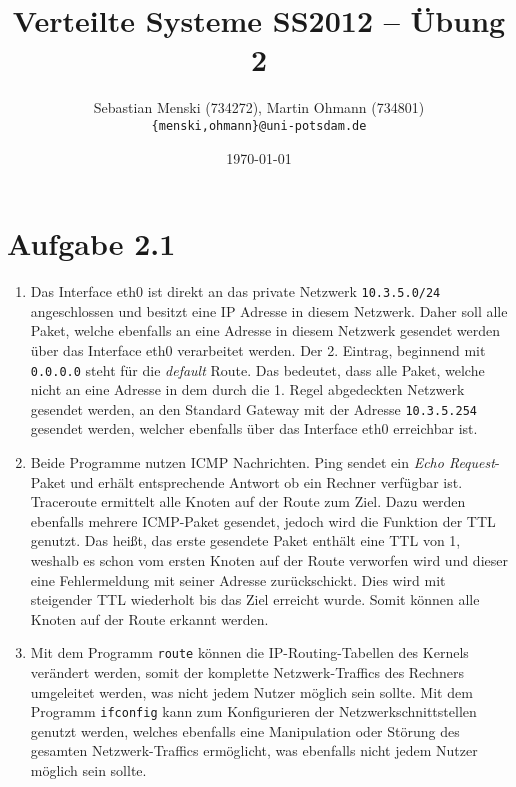 \documentclass[german,12pt,a4paper]{article}
\begin{document}
\title{\textbf{Verteilte Systeme SS2012 -- Übung 2}}
\author{Sebastian Menski (734272), Martin Ohmann (734801) \\ \texttt{\{menski,ohmann\}@uni-potsdam.de}}
\date{\today}

\maketitle

\section*{Aufgabe 2.1}

\begin{enumerate}

	\item Das Interface eth0 ist direkt an das private Netzwerk \texttt{10.3.5.0/24} angeschlossen und
	besitzt eine IP Adresse in diesem Netzwerk. Daher soll alle Paket, welche ebenfalls an eine
	Adresse in diesem Netzwerk gesendet werden über das Interface eth0 verarbeitet werden. Der 2.
	Eintrag, beginnend mit \texttt{0.0.0.0} steht für die \textit{default} Route. Das bedeutet, dass
	alle Paket, welche nicht an eine Adresse in dem durch die 1. Regel abgedeckten Netzwerk gesendet
	werden, an den Standard Gateway mit der Adresse \texttt{10.3.5.254} gesendet werden, welcher
	ebenfalls über das Interface eth0 erreichbar ist.

	\item Beide Programme nutzen ICMP Nachrichten. Ping sendet ein \textit{Echo Request}-Paket und
	erhält entsprechende Antwort ob ein Rechner verfügbar ist. Traceroute ermittelt alle Knoten auf
	der Route zum Ziel. Dazu werden ebenfalls mehrere ICMP-Paket gesendet, jedoch wird die Funktion
	der TTL genutzt. Das heißt, das erste gesendete Paket enthält eine TTL von 1, weshalb es schon vom
	ersten Knoten auf der Route verworfen wird und dieser eine Fehlermeldung mit seiner Adresse
	zurückschickt. Dies wird mit steigender TTL wiederholt bis das Ziel erreicht wurde. Somit können
	alle Knoten auf der Route erkannt werden.

	\item Mit dem Programm \texttt{route} können die IP-Routing-Tabellen des Kernels verändert werden,
	somit der komplette Netzwerk-Traffics des Rechners umgeleitet werden, was nicht jedem Nutzer
	möglich sein sollte. Mit dem Programm \texttt{ifconfig} kann zum Konfigurieren der
	Netzwerkschnittstellen genutzt werden, welches ebenfalls eine Manipulation oder Störung des
	gesamten Netzwerk-Traffics ermöglicht, was ebenfalls nicht jedem Nutzer möglich sein sollte.

\end{enumerate}
\end{document}
